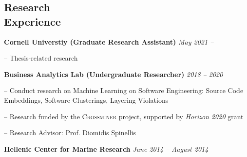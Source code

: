 \documentclass[margin, 10pt]{res}
\begin{document}
\begin{resume}
%
%
%

\section{Research \\ Experience}

\textbf{Cornell Universtiy (Graduate Research Assistant)} \hfill \emph{May 2021 --}
\begin{compactitem}
	\item[--] Thesis-related research
\end{compactitem}

\textbf{Business Analytics Lab (Undergraduate Researcher)} \hfill \emph{2018 -- 2020}
\begin{compactitem}
\item[--] Conduct research on Machine Learning on Software Engineering: Source Code Embeddings, Software Clusterings, Layering Violations
\item[--] Research funded by the \textsc{Crossminer} project, supported by \emph{Horizon 2020} grant
\item[--] Research Advisor: Prof. Diomidis Spinellis
\end{compactitem}

\textbf{Hellenic Center for Marine Research} \hfill \emph{June 2014 -- August 2014}




\end{resume}
\end{document}
